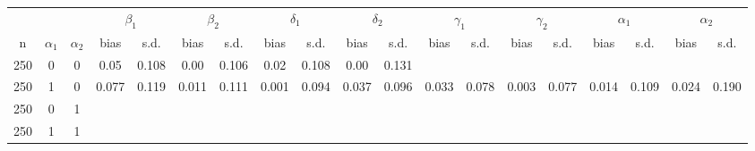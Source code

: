 \documentclass{article}
\begin{document}
{\begin{center}
\begin{sideways}
\begin{tabular}{ccccccccccccccccccc}
\hline
&&&\multicolumn{2}{c}{${\beta_1}$}&\multicolumn{2}{c}{${\beta_2}$}&\multicolumn{2}{c}{${\delta_1}$}&\multicolumn{2}{c}{${\delta_2}$}&\multicolumn{2}{c}{${\gamma_1}$}&\multicolumn{2}{c}{${\gamma_2}$}&\multicolumn{2}{c}{$\alpha_1$}&\multicolumn{2}{c}{$\alpha_2$}\\
n & $\alpha_1$ & $\alpha_2$ & bias & s.d. & bias & s.d.& bias & s.d.& bias & s.d.& bias & s.d. & bias & s.d. & bias & s.d. & bias & s.d. \\
250 & 0 & 0 & 0.05 & 0.108 & 0.00 & 0.106 & 0.02 & 0.108 & 0.00 & 0.131 & & & & & &&\\
250 & 1 & 0 & 0.077 & 0.119 & 0.011 & 0.111 & 0.001 & 0.094 & 0.037 & 0.096 & 0.033 & 0.078 & 0.003 & 0.077 & 0.014 & 0.109 & 0.024 & 0.190\\
250 & 0 & 1 & & & & & & & & & & & & & & & \\
250 & 1 & 1 & & & & & & & & & & & & & & & \\
\hline
\end{tabular}
\end{sideways}
\end{center}
}












%
%
%
%

\end{document}
